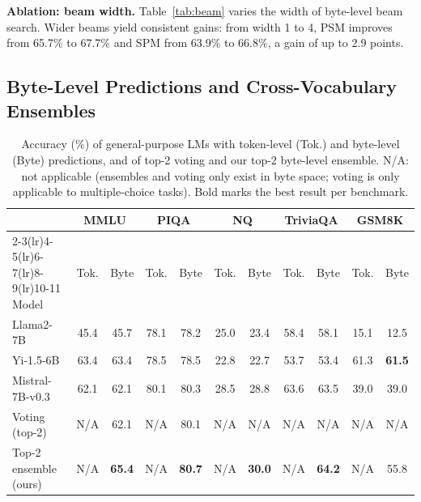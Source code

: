 \documentclass{article} %
\begin{document}
\textbf{Ablation: beam width.} Table~\ref{tab:beam} varies the width of byte-level beam search. Wider beams yield consistent gains: from width 1 to 4, PSM improves from 65.7\% to 67.7\% and SPM from 63.9\% to 66.8\%, a gain of up to 2.9 points.

\subsection{Byte-Level Predictions and Cross-Vocabulary Ensembles}
\label{sec:exp_ensemble}

\begin{table}[t]
\caption{Accuracy (\%) of general-purpose LMs with token-level (Tok.) and byte-level (Byte) predictions, and of top-2 voting and our top-2 byte-level ensemble. N/A: not applicable (ensembles and voting only exist in byte space; voting is only applicable to multiple-choice tasks). Bold marks the best result per benchmark.}
\label{tab:general}
\begin{center}
\setlength{\tabcolsep}{4.2pt}
\begin{tabular}{lcccccccccc}
\toprule
& \multicolumn{2}{c}{MMLU} & \multicolumn{2}{c}{PIQA} & \multicolumn{2}{c}{NQ} & \multicolumn{2}{c}{TriviaQA} & \multicolumn{2}{c}{GSM8K} \\
\cmidrule(lr){2-3}\cmidrule(lr){4-5}\cmidrule(lr){6-7}\cmidrule(lr){8-9}\cmidrule(lr){10-11}
Model & Tok. & Byte & Tok. & Byte & Tok. & Byte & Tok. & Byte & Tok. & Byte \\
\midrule
Llama2-7B & 45.4 & 45.7 & 78.1 & 78.2 & 25.0 & 23.4 & 58.4 & 58.1 & 15.1 & 12.5 \\
Yi-1.5-6B & 63.4 & 63.4 & 78.5 & 78.5 & 22.8 & 22.7 & 53.7 & 53.4 & 61.3 & \textbf{61.5} \\
Mistral-7B-v0.3 & 62.1 & 62.1 & 80.1 & 80.3 & 28.5 & 28.8 & 63.6 & 63.5 & 39.0 & 39.0 \\
\midrule
Voting (top-2) & N/A & 62.1 & N/A & 80.1 & N/A & N/A & N/A & N/A & N/A & N/A \\
Top-2 ensemble (ours) & N/A & \textbf{65.4} & N/A & \textbf{80.7} & N/A & \textbf{30.0} & N/A & \textbf{64.2} & N/A & 55.8 \\
\bottomrule
\end{tabular}
\end{center}
\end{table}
\end{document}
